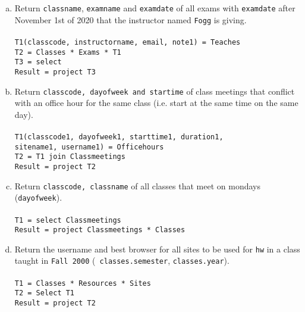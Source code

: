 \documentclass[11pt]{article}
\begin{document}
\begin{enumerate}  [(a)]
\item Return {\tt classname}, {\tt examname} and {\tt examdate} of
  all exams with {\tt examdate} after November 1st of 2020 that the
  instructor named {\tt Fogg} is giving. \\\\
 \texttt{T1(classcode, instructorname, email, note1) = Teaches} \\ 
 \texttt{T2 = Classes * Exams * T1} \\
 \texttt{T3 = select} \\
 \texttt{Result = project T3}

\item Return {\tt classcode, dayofweek and startime} of class meetings
  that conflict with an office hour for the same class (i.e. start at
  the same time on the same day). \\\\
 \texttt{T1(classcode1, dayofweek1, starttime1, duration1, \\ sitename1, username1) = Officehours} \\
 \texttt{T2 = T1 join Classmeetings} \\
 \texttt{Result = project T2}

\item Return {\tt classcode, classname} of all classes that meet on
  mondays ({\tt dayofweek}). \\\\
 \texttt{T1 = select Classmeetings} \\
 \texttt{Result = project Classmeetings * Classes}

\item Return the username and best browser for all sites to be used
  for {\tt hw} in a class taught in {\tt Fall 2000} ({\tt
    classes.semester}, {\tt classes.year}). \\\\
\texttt{T1 = Classes * Resources * Sites} \\
\texttt{T2 = Select T1} \\
\texttt{Result = project T2}


\end{enumerate}
\end{document}
